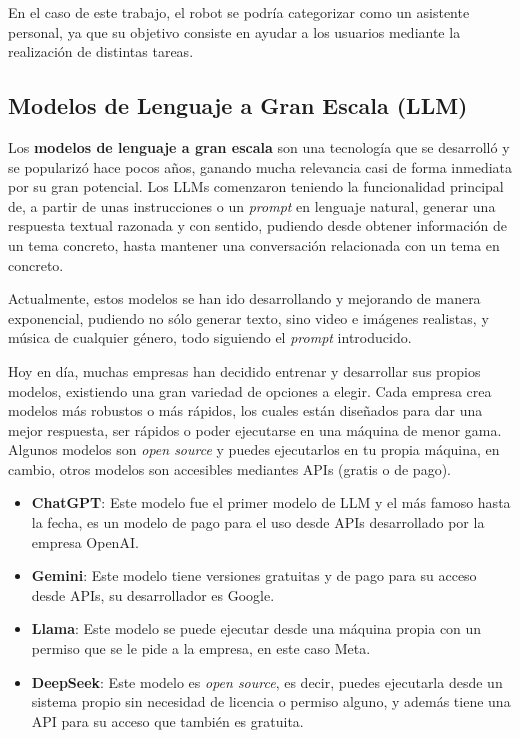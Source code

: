 \documentclass[../main.tex]{subfiles}
\begin{document}
En el caso de este trabajo, el robot se podría categorizar como un asistente personal, ya que su objetivo consiste en ayudar a los usuarios mediante la realización de distintas tareas.

\subsection{Modelos de Lenguaje a Gran Escala (LLM)}
Los \textbf{modelos de lenguaje a gran escala} son una tecnología que se desarrolló y se popularizó hace pocos años, ganando mucha relevancia casi de forma inmediata
por su gran potencial. Los LLMs comenzaron teniendo la funcionalidad principal de, a partir de unas instrucciones o un \textit{prompt} en lenguaje natural, generar una respuesta
textual razonada y con sentido, pudiendo desde obtener información de un tema concreto, hasta mantener una conversación relacionada con un tema en concreto. 

Actualmente, estos modelos se han ido desarrollando y mejorando de manera exponencial, 
pudiendo no sólo generar texto, sino video e imágenes realistas, y música de cualquier género, todo siguiendo el \textit{prompt} introducido. 

Hoy en día, muchas empresas han decidido entrenar y desarrollar sus propios modelos, existiendo una gran variedad de opciones a elegir. Cada empresa crea modelos
más robustos o más rápidos, los cuales están diseñados para dar una mejor respuesta, ser rápidos o poder ejecutarse en una máquina de menor gama. Algunos modelos son 
\textit{open source} y puedes ejecutarlos en tu propia máquina, en cambio, otros modelos son accesibles mediantes APIs (gratis o de pago).

\begin{itemize}
    \item \textbf{ChatGPT}: Este modelo fue el primer modelo de LLM y el más famoso hasta la fecha, es un modelo de pago para el uso desde APIs desarrollado por la empresa OpenAI.
    \item \textbf{Gemini}: Este modelo tiene versiones gratuitas y de pago para su acceso desde APIs, su desarrollador es Google.
    \item \textbf{Llama}: Este modelo se puede ejecutar desde una máquina propia con un permiso que se le pide a la empresa, en este caso Meta.
    \item \textbf{DeepSeek}: Este modelo es \textit{open source}, es decir, puedes ejecutarla desde un sistema propio sin necesidad de licencia o permiso alguno, y además tiene una API para su acceso
    que también es gratuita.
\end{itemize}
\end{document}
